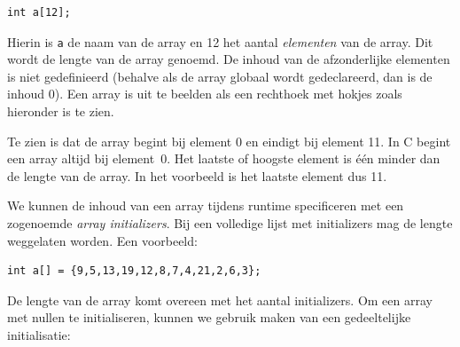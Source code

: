 \documentclass[a4paper,10pt,fleqn,twoside]{article}
\begin{document}
\begin{lstlisting}
int a[12];
\end{lstlisting}

Hierin is \verb|a| de naam van de array en 12 het aantal \textsl{elementen} van de array. Dit wordt de lengte van de array genoemd. De inhoud van de afzonderlijke elementen is niet gedefinieerd (behalve als de array globaal wordt gedeclareerd, dan is de inhoud 0).  Een array is uit te beelden als een rechthoek met hokjes zoals hieronder is te zien.

\begin{figure}[!ht]
\centering
{}
\end{figure}

Te zien is dat de array begint bij element 0 en eindigt bij element 11. In C begint een array altijd bij element~0. Het laatste of hoogste element is \'e\'en minder dan de lengte van de array. In het voorbeeld is het laatste element dus 11.

%
%

We kunnen de inhoud van een array tijdens runtime specificeren met een zogenoemde \textsl{array initializers}. Bij een volledige lijst met initializers mag de lengte weggelaten worden. Een voorbeeld:

\begin{lstlisting}
int a[] = {9,5,13,19,12,8,7,4,21,2,6,3};
\end{lstlisting}

De lengte van de array komt overeen met het aantal initializers. Om een array met nullen te initialiseren, kunnen we gebruik maken van een gedeeltelijke initialisatie:
\end{document}
